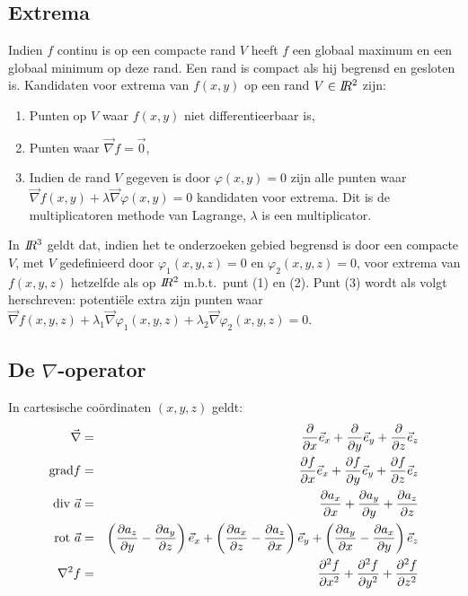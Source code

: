 \subsection{Extrema}
Indien $f$ continu is op een compacte rand $V$ heeft $f$ een globaal
maximum en een globaal minimum op deze rand. Een rand is compact als hij
begrensd en gesloten is.
\npar
Kandidaten voor extrema van $f(x,y)$ op een rand $V\in I\hspace{-1mm}R^2$ zijn:
\begin{enumerate}
\item Punten op $V$ waar $f(x,y)$ niet differentieerbaar is,
\item Punten waar $\vec{\nabla}f=\vec{0}$,
\item Indien de rand $V$ gegeven is door $\varphi(x,y)=0$ zijn alle punten
      waar $\vec{\nabla}f(x,y)+\lambda\vec{\nabla}\varphi(x,y)=0$ kandidaten
      voor extrema. Dit is de multiplicatoren methode van Lagrange, $\lambda$
      is een multiplicator.
\end{enumerate}
In $I\hspace{-1mm}R^3$ geldt dat, indien het te onderzoeken gebied begrensd is door
een compacte $V$, met $V$ gedefinieerd door $\varphi_1(x,y,z)=0$ en
$\varphi_2(x,y,z)=0$, voor extrema van $f(x,y,z)$ hetzelfde als op $I\hspace{-1mm}R^2$
m.b.t.\ punt (1) en (2). Punt (3) wordt als volgt herschreven: potenti\"ele
extra zijn punten waar
$\vec{\nabla}f(x,y,z)+\lambda_1\vec{\nabla}\varphi_1(x,y,z)+\lambda_2\vec{\nabla}\varphi_2(x,y,z)=0$.

\subsection{De $\nabla$-operator}
In cartesische co\"ordinaten $(x,y,z)$ geldt:
\begin{eqnarray*}
\vec{\nabla}     &=&\frac{\partial }{\partial x}\vec{e}_{x}+\frac{\partial }{\partial y}\vec{e}_{y}+\frac{\partial }{\partial z}\vec{e}_{z}\\
{\rm grad}f      &=&\frac{\partial f}{\partial x}\vec{e}_{x}+\frac{\partial f}{\partial y}\vec{e}_{y}+\frac{\partial f}{\partial z}\vec{e}_{z}\\
{\rm div}~\vec{a}&=&\frac{\partial a_x}{\partial x}+\frac{\partial a_y}{\partial y}+\frac{\partial a_z}{\partial z}\\
{\rm rot}~\vec{a}&=&\left(\frac{\partial a_z}{\partial y}-\frac{\partial a_y}{\partial z}\right)\vec{e}_{x}+
                    \left(\frac{\partial a_x}{\partial z}-\frac{\partial a_z}{\partial x}\right)\vec{e}_{y}+
                    \left(\frac{\partial a_y}{\partial x}-\frac{\partial a_x}{\partial y}\right)\vec{e}_{z}\\
\nabla^2 f       &=&\frac{\partial^2 f}{\partial x^2}+\frac{\partial^2 f}{\partial y^2}+\frac{\partial^2 f}{\partial z^2}
\end{eqnarray*}

